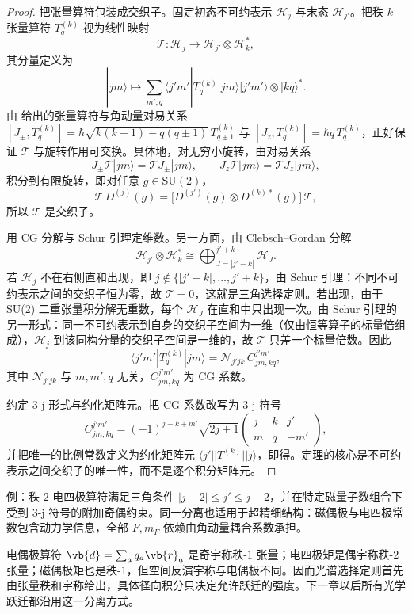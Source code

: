 \begin{proof}
把张量算符包装成交织子。固定初态不可约表示 $\mathcal H_j$ 与末态 $\mathcal H_{j'}$。把秩-$k$ 张量算符 $T_q^{(k)}$ 视为线性映射
\begin{equation*}
 \mathcal T:\mathcal H_j\longrightarrow
 \mathcal H_{j'}\otimes\mathcal H_k^*,
\end{equation*}
其分量定义为
\begin{equation*}
 |jm\rangle\mapsto
 \sum_{m',q}\langle j'm'|T_q^{(k)}|jm\rangle
 |j'm'\rangle\otimes|kq\rangle^*.
\end{equation*}
由 给出的张量算符与角动量对易关系 $[J_\pm,T_q^{(k)}]=\hbar\sqrt{k(k+1)-q(q\pm1)}\,T_{q\pm1}^{(k)}$ 与 $[J_z,T_q^{(k)}]=\hbar q\,T_q^{(k)}$，正好保证 $\mathcal T$ 与旋转作用可交换。具体地，对无穷小旋转，由对易关系
\begin{equation*}
 J_\pm\mathcal T|jm\rangle=\mathcal T J_\pm|jm\rangle,
 \qquad
 J_z\mathcal T|jm\rangle=\mathcal T J_z|jm\rangle,
\end{equation*}
积分到有限旋转，即对任意 $g\in\mathrm{SU}(2)$，
\begin{equation*}
 \mathcal T\,D^{(j)}(g)=\bigl[D^{(j')}(g)\otimes D^{(k)*}(g)\bigr]\,\mathcal T,
\end{equation*}
所以 $\mathcal T$ 是交织子。

用 CG 分解与 Schur 引理定维数。另一方面，由 Clebsch--Gordan 分解
\begin{equation*}
 \mathcal H_{j'}\otimes\mathcal H_k^*
 \cong\bigoplus_{J=|j'-k|}^{j'+k}\mathcal H_J.
\end{equation*}
若 $\mathcal H_j$ 不在右侧直和出现，即 $j\notin\{|j'-k|,\ldots,j'+k\}$，由 Schur 引理：不同不可约表示之间的交织子恒为零，故 $\mathcal T=0$，这就是三角选择定则。若出现，由于 SU(2) 二重张量积分解无重数，每个 $\mathcal H_J$ 在直和中只出现一次。由 Schur 引理的另一形式：同一不可约表示到自身的交织子空间为一维（仅由恒等算子的标量倍组成），$\mathcal H_j$ 到该同构分量的交织子空间是一维的，故 $\mathcal T$ 只差一个标量倍数。因此
\begin{equation*}
 \langle j'm'|T_q^{(k)}|jm\rangle
 =\mathcal N_{j'jk}\,C^{j'm'}_{jm,kq},
\end{equation*}
其中 $\mathcal N_{j'jk}$ 与 $m,m',q$ 无关，$C^{j'm'}_{jm,kq}$ 为 CG 系数。

约定 3-j 形式与约化矩阵元。把 CG 系数改写为 3-j 符号
\begin{equation*}
 C^{j'm'}_{jm,kq}
 =(-1)^{j-k+m'}\sqrt{2j+1}
 \begin{pmatrix} j&k&j'\\ m&q&-m'\end{pmatrix},
\end{equation*}
并把唯一的比例常数定义为约化矩阵元 $\langle j'||T^{(k)}||j\rangle$，即得。定理的核心是不可约表示之间交织子的唯一性，而不是逐个积分矩阵元。
\end{proof}

例：秩-$2$ 电四极算符满足三角条件 $|j-2|\le j'\le j+2$，并在特定磁量子数组合下受到 3-j 符号的附加奇偶约束。同一分离也适用于超精细结构：磁偶极与电四极常数包含动力学信息，全部 $F,m_F$ 依赖由角动量耦合系数承担。

电偶极算符 $\vb{d}=\sum_aq_a\vb{r}_a$ 是奇宇称秩-$1$ 张量；电四极矩是偶宇称秩-$2$ 张量；磁偶极矩也是秩-$1$，但空间反演宇称与电偶极不同。因而光谱选择定则首先由张量秩和宇称给出，具体径向积分只决定允许跃迁的强度。下一章以后所有光学跃迁都沿用这一分离方式。
